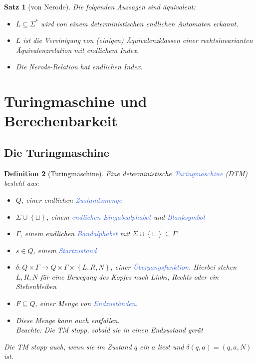 \documentclass[11pt]{scrartcl}
\newcommand{\tcol}[1]{\textcolor{RoyalBlue}{#1}}
\newcommand{\set}[1]{\left\lbrace #1\right\rbrace}
\theoremstyle{break}
\newtheorem{satz}{Satz}[section]
\newtheorem{defi}[satz]{Definition}
\begin{document}
    \begin{satz}[von Nerode]
        Die folgenden Aussagen sind äquivalent:
        \begin{itemize}
            \item $L\subseteq\Sigma^*$ wird von einem deterministischen endlichen Automaten erkannt.
            \item $L$ ist die Vereinigung von (einigen) Äquivalenzklassen einer rechtsinvarianten Äquivalenzrelation mit endlichem Index.
            \item Die Nerode-Relation hat endlichen Index.
        \end{itemize}
    \end{satz}



    \section{Turingmaschine und Berechenbarkeit}
	\label{sec:turingmaschineindexund-berechenbarkeit}


    \subsection{Die Turingmaschine}
	\label{subsec:die-turingmaschineindex}

    \begin{defi}[Turingmaschine]
        Eine deterministische \tcol{Turingmaschine} (DTM) besteht aus:
        \begin{itemize}
            \item $Q$, einer endlichen \tcol{Zustandsmenge}
            \item $\Sigma\cup\set{\sqcup}$, einem \tcol{endlichen Eingabealphabet} und \tcol{Blanksymbol}
            \item $\Gamma$, einem endlichen \tcol{Bandalphabet} mit $\Sigma\cup\set{\sqcup}\subseteq\Gamma$
            \item $s\in Q$, einem \tcol{Startzustand}
            \item $\delta\colon Q\times\Gamma\to Q\times \Gamma\times\set{L,R,N}$, einer \tcol{Übergangsfunktion}.
                Hierbei stehen $L,R,N$ für eine Bewegung des Kopfes nach Links, Rechts oder ein Stehenbleiben
            \item $F\subseteq Q$, einer Menge von \tcol{Endzuständen}.
            \item Diese Menge kann auch entfallen.\\
            Beachte: Die TM stopp, sobald sie in einen Endzustand gerät
        \end{itemize}
        Die TM stopp auch, wenn sie im Zustand $q$ ein $a$ liest und $\delta(q,a)=(q,a,N)$ ist.
    \end{defi}
\end{document}
